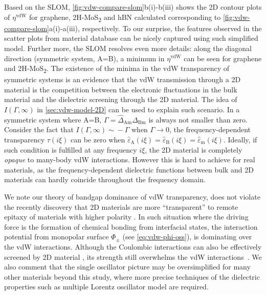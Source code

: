 Based on the SLOM, \autoref{fig:vdw-compare-slom}b(i)-b(iii) shows the 2D
contour plots of $\eta^{\mathrm{vdW}}$ for graphene,
2H-MoS\textsubscript{2} and hBN calculated  corresponding to
\autoref{fig:vdw-compare-slom}a(i)-a(iii), respectively.
%
To our surprise, the features observed in the scatter plots from
material database can be nicely captured using such simplified
model.
%
Further more, the SLOM resolves even more details: along the diagonal
direction (\ie symmetric system, A=B), a minimum in
$\eta^{\mathrm{vdW}}$ can be seen for graphene and
2H-MoS\textsubscript{2}.
%
The existence of the minima in the vdW transparency of symmetric
systems is an evidence that the vdW transmission through a 2D material
is the competition between the electronic fluctuations in the bulk
material and the dielectric screening through the 2D material. The
idea of $I(\Gamma, \infty)$ in \autoref{sec:vdw-model-2D} can be used
to explain such scenario. In a symmetric system where A=B,
$\Gamma=\hat{\Delta}_{\mathrm{Am}}\hat{\Delta}_{\mathrm{Bm}}$ is
always not smaller than zero.
%
Consider the fact that $I(\Gamma, \infty) \sim{} -\Gamma$ when
$\Gamma \to 0$, the frequency-dependent transparency $\tau(i\xi)$ can
be zero when
$\hat{\varepsilon}_{\mathrm{A}}(i\xi) =
\hat{\varepsilon}_{\mathrm{B}}(i\xi) =
\hat{\varepsilon}_{\mathrm{m}}(i\xi)$.
%
Ideally, if such condition is fulfilled at any frequency \(i\xi\), the
2D material is completely \textit{opaque} to many-body vdW
interactions. However this is hard to achieve for real materials, as
the frequency-dependent dielectric functions between bulk and 2D
materials can hardly coincide throughout the frequency domain.


We note our theory of bandgap dominance of vdW transparency, does not
violate the recently discovery that 2D materials are more
``transparent'' to remote epitaxy of materials with higher polarity
\cite{Kong_2018_pol}. In such situation where the driving force is the
formation of chemical bonding from interfacial states, the interaction
potential from monopolar surface \(\Phi_{\pm}\) (see
\autoref{eq:vdw-phi-oss}), is dominating over the vdW
interactions. Although the Coulombic interactions can also be
effectively screened by 2D material
\cite{Li_2014_screen,Ambrosetti_2019_jpcl}, its strength still
overwhelms the vdW
interactions~. We also comment that
the single oscillator picture may be oversimplified for many other
materials beyond this study, where more precise techniques of the
dielectric properties such as multiple Lorentz oscillator model are
required.

